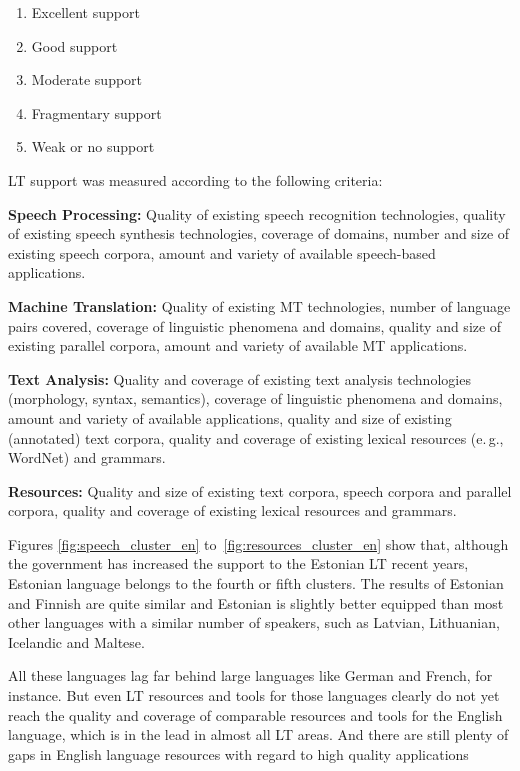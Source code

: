 \begin{multicols}{2}
\begin{enumerate}
\item Excellent support
\item Good support
\item Moderate support
\item Fragmentary support
\item Weak or no support
\end{enumerate}

LT support was measured according to the following criteria:

\textbf{Speech Processing:} Quality of existing speech recognition technologies, quality of existing speech synthesis technologies, coverage of domains, number and size of existing speech corpora, amount and variety of available speech-based applications.

\textbf{Machine Translation:} Quality of existing MT technologies, number of language pairs covered, coverage of linguistic phenomena and domains, quality and size of existing parallel corpora, amount and variety of available MT applications.

\textbf{Text Analysis:} Quality and coverage of existing text analysis technologies (morphology, syntax, semantics), coverage of linguistic phenomena and domains, amount and variety of available applications, quality and size of existing (annotated) text corpora, quality and coverage of existing lexical resources (e.\,g., WordNet) and grammars.

\textbf{Resources:} Quality and size of existing text corpora, speech corpora and parallel corpora, quality and coverage of existing lexical resources and grammars.

Figures \ref{fig:speech_cluster_en} to~\ref{fig:resources_cluster_en} show that, although the government has increased the support to the Estonian LT recent years, Estonian language belongs to the fourth or fifth clusters. 
The results of Estonian and Finnish are quite similar and Estonian is slightly better equipped than most other languages with a similar number of speakers, such as Latvian, Lithuanian, Icelandic and Maltese. 

All these languages lag far behind large languages like German and French, for instance. 
But even LT resources and tools for those languages clearly do not yet reach the quality and coverage of comparable resources and tools for the English language, which is in the lead in almost all LT areas. 
And there are still plenty of gaps in English language resources with regard to high quality applications


\end{multicols}

